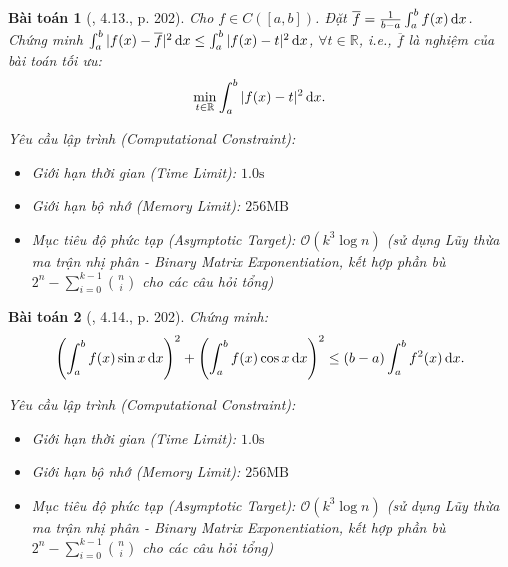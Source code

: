 \documentclass{article}
\newtheorem{baitoan}{Bài toán}
\begin{document}
\begin{baitoan}[\cite{Quoc_Long_Dat_Nam_VMC}, 4.13., p. 202]
	Cho $f\in C([a,b])$. Đặt $\overline{f} = \frac{1}{b - a}\int_a^b f(x)\,{\rm d}x$. Chứng minh $\int_a^b |f(x) - \overline{f}|^2\,{\rm d}x\le\int_a^b |f(x) - t|^2\,{\rm d}x$, $\forall t\in\mathbb{R}$, i.e., $\overline{f}$ là nghiệm của bài toán tối ưu:
	\begin{equation*}
		\min_{t\in\mathbb{R}} \int_a^b |f(x) - t|^2\,{\rm d}x.
	\end{equation*}

    \vspace{0.5em}
    \emph{Yêu cầu lập trình (Computational Constraint):}
    \begin{itemize}
        \item Giới hạn thời gian (Time Limit): $1.0\mathrm{s}$
        \item Giới hạn bộ nhớ (Memory Limit): $256\mathrm{MB}$
        \item Mục tiêu độ phức tạp (Asymptotic Target): $\mathcal{O}(k^3 \log n)$ (sử dụng Lũy thừa ma trận nhị phân - Binary Matrix Exponentiation, kết hợp phần bù $2^n - \sum_{i=0}^{k-1} \binom{n}{i}$ cho các câu hỏi tổng)
    \end{itemize}
\end{baitoan}


\begin{baitoan}[\cite{Quoc_Long_Dat_Nam_VMC}, 4.14., p. 202]
	Chứng minh:
	\begin{equation*}
		\left(\int_a^b f(x)\sin x\,{\rm d}x\right)^2 + \left(\int_a^b f(x)\cos x\,{\rm d}x\right)^2\le(b - a)\int_a^b f^2(x)\,{\rm d}x.
	\end{equation*}

    \vspace{0.5em}
    \emph{Yêu cầu lập trình (Computational Constraint):}
    \begin{itemize}
        \item Giới hạn thời gian (Time Limit): $1.0\mathrm{s}$
        \item Giới hạn bộ nhớ (Memory Limit): $256\mathrm{MB}$
        \item Mục tiêu độ phức tạp (Asymptotic Target): $\mathcal{O}(k^3 \log n)$ (sử dụng Lũy thừa ma trận nhị phân - Binary Matrix Exponentiation, kết hợp phần bù $2^n - \sum_{i=0}^{k-1} \binom{n}{i}$ cho các câu hỏi tổng)
    \end{itemize}
\end{baitoan}
\end{document}

